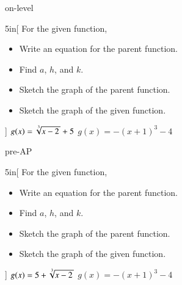 

\begin{taggedblock}{on-level}
    \begin{my2Problems}{5in}[
        For the given function,
        \vspace{-0.5em}
        \begin{itemize}[nosep]
            \item Write an equation for the parent function.
            \item Find $a$, $h$, and $k$.
            \item Sketch the graph of the parent function.
            \item Sketch the graph of the given function.
        \end{itemize}
        ]
        {
            $g(x) = \myRoot[3]{x-2} + 5$
        }
        {
            $g(x) = -(x+1)^3 - 4$
        }
    \end{my2Problems}
\end{taggedblock}

\begin{taggedblock}{pre-AP}
    \begin{my2Problems}{5in}[
        For the given function,
        \vspace{-0.5em}
        \begin{itemize}[nosep]
            \item Write an equation for the parent function.
            \item Find $a$, $h$, and $k$.
            \item Sketch the graph of the parent function.
            \item Sketch the graph of the given function.
        \end{itemize}
        ]
        {
            $g(x) = 5 + \myRoot[3]{x-2} $
        }
        {
            $g(x) = -(x+1)^3 - 4$
        }
    \end{my2Problems}
\end{taggedblock}
